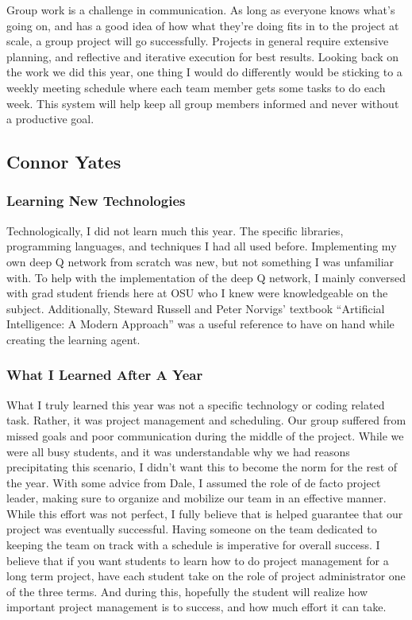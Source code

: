 Group work is a challenge in communication. As long as everyone knows what's going on, and has a good idea of how what they're doing fits in to the project at scale,
a group project will go successfully. Projects in general require extensive planning, and reflective and iterative execution for best results. Looking back on the work
we did this year, one thing I would do differently would be sticking to a weekly meeting schedule where each team member gets some tasks to do each week. This system
will help keep all group members informed and never without a productive goal.

\subsection{Connor Yates}
\subsubsection{Learning New Technologies}
Technologically, I did not learn much this year. The specific libraries, programming languages, and techniques I had all used before. Implementing my own deep Q network from scratch was new, but not something I was unfamiliar with. To help with the implementation of the deep Q network, I mainly conversed with grad student friends here at OSU who I knew were knowledgeable on the subject. Additionally, Steward Russell and Peter Norvigs' textbook ``Artificial Intelligence: A Modern Approach'' was a useful reference to have on hand while creating the learning agent.
\subsubsection{What I Learned After A Year}
What I truly learned this year was not a specific technology or coding related task. Rather, it was project management and scheduling. Our group suffered from missed goals and poor communication during the middle of the project. While we were all busy students, and it was understandable why we had reasons precipitating this scenario, I didn't want this to become the norm for the rest of the year. With some advice from Dale, I assumed the role of de facto project leader, making sure to organize and mobilize our team in an effective manner. While this effort was not perfect, I fully believe that is helped guarantee that our project was eventually successful. Having someone on the team dedicated to keeping the team on track with a schedule is imperative for overall success. I believe that if you want students to learn how to do project management for a long term project, have each student take on the role of project administrator one of the three terms. And during this, hopefully the student will realize how important project management is to success, and how much effort it can take.

